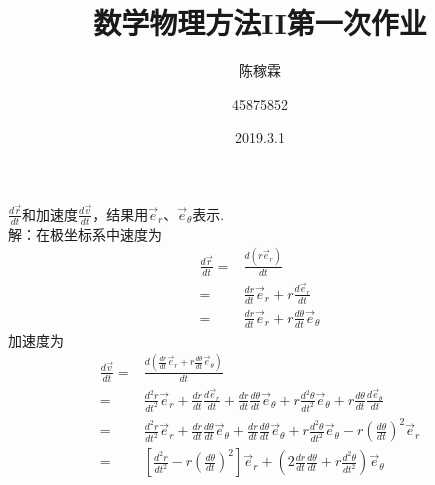 \documentclass[10pt,a4paper]{article}
\title{数学物理方法II第一次作业}
\author{陈稼霖 \and 45875852}
\date{2019.3.1}
\begin{document}
\maketitle
\section{}
$\frac{d\vec{r}}{dt}$和加速度$\frac{d\vec{v}}{dt}$，结果用$\vec{e}_r$、$\vec{e}_{\theta}$表示.\\
解：在极坐标系中速度为
\begin{align*}
\frac{d\vec{r}}{dt}=&\frac{d(r\vec{e}_r)}{dt}\\
=&\frac{dr}{dt}\vec{e}_r+r\frac{d\vec{e}_r}{dt}\\
=&\frac{dr}{dt}\vec{e}_r+r\frac{d\theta}{dt}\vec{e}_{\theta}
\end{align*}
加速度为
\begin{align*}
\frac{d\vec{v}}{dt}=&\frac{d(\frac{dr}{dt}\vec{e}_r+r\frac{d\theta}{dt}\vec{e}_{\theta})}{dt}\\
=&\frac{d^2r}{dt^2}\vec{e}_r+\frac{dr}{dt}\frac{d\vec{e}_r}{dt}+\frac{dr}{dt}\frac{d\theta}{dt}\vec{e}_{\theta}+r\frac{d^2\theta}{dt^2}\vec{e}_{\theta}+r\frac{d\theta}{dt}\frac{d\vec{e}_{\theta}}{dt}\\
=&\frac{d^2r}{dt^2}\vec{e}_r+\frac{dr}{dt}\frac{d\theta}{dt}\vec{e}_{\theta}+\frac{dr}{dt}\frac{d\theta}{dt}\vec{e}_{\theta}+r\frac{d^2\theta}{dt^2}\vec{e}_{\theta}-r(\frac{d\theta}{dt})^2\vec{e}_r\\
=&[\frac{d^2r}{dt^2}-r(\frac{d\theta}{dt})^2]\vec{e}_r+(2\frac{dr}{dt}\frac{d\theta}{dt}+r\frac{d^2\theta}{dt^2})\vec{e}_{\theta}
\end{align*}
\end{document}
